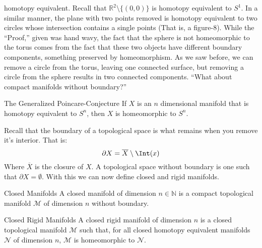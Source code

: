 \documentclass[crop=false,class=book,oneside]{standalone}                      %
\begin{document}
            homotopy equivalent. Recall that
            $\mathbb{R}^{2}\setminus \{(0,0)\}$ is homotopy
            equivalent to $S^{1}$. In a similar manner,
            the plane with two points removed is homotopy
            equivalent to two circles whose intersection
            contains a single points (That is, a figure-$8$).
            While the ``Proof,'' given was hand wavy,
            the fact that the sphere is not homeomorphic to the
            torus comes from the fact that these two objects
            have different boundary components, something
            preserved by homeomorphism. As we saw before, we
            can remove a circle from the torus, leaving one connected
            surface, but removing a circle from the sphere results in
            two connected components.
            ``What about compact manifolds without boundary?''
            \begin{ltheorem}{The Generalized Poincare-Conjecture}
                If $X$ is an $n$ dimensional manifold that
                is homotopy equivalent to $S^{n}$, then $X$
                is homeomorphic to $S^{n}$.
            \end{ltheorem}
            \vspace{5pt}
            Recall that the boundary of a topological space
            is what remains when you remove it's interior.
            That is:
            \begin{equation}
                \partial{X}=\overline{X}\setminus\Int(x)
            \end{equation}
            Where $\overline{X}$ is the closure of $X$.
            A topological space without boundary is one such that
            $\partial{X}=\emptyset$. With this we can now define
            closed and rigid manifolds.
            \begin{ldefinition}{Closed Manifolds}
                A closed manifold of dimension $n\in\mathbb{N}$ is
                a compact topological manifold $\mathcal{M}$ of
                dimension $n$ without boundary.
            \end{ldefinition}
            \begin{ldefinition}{Closed Rigid Manifolds}
                A closed rigid manifold of dimension $n$
                is a closed topological manifold $\mathcal{M}$
                such that, for all closed homotopy equivalent
                manifolds $\mathcal{N}$ of dimension $n$,
                $\mathcal{M}$ is homeomorphic to $\mathcal{N}$.
            \end{ldefinition}
\end{document}
